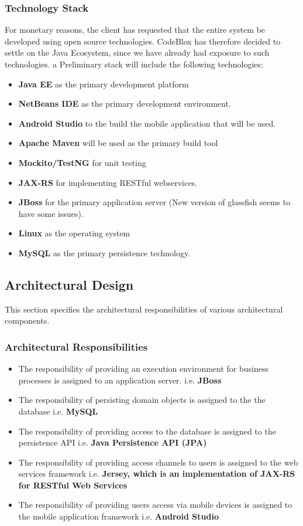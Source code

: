 \documentclass[a4paper,12pt]{article}
\begin{document}
	\subsubsection{Technology Stack}
	For monetary reasons, the client has requested that the entire system be developed using open source technologies. CodeBlox has therefore decided to settle on the Java Ecosystem, since we have already had exposure to such technologies. a Preliminary stack will include the following technologies:
	
	\begin{itemize}
		\item \textbf{Java EE} as the primary development platform
		\item \textbf{NetBeans IDE} as the primary development environment.
		\item \textbf{Android Studio} to the build the mobile application that will be used.
		\item \textbf{Apache Maven} will be used as the primary build tool
		\item \textbf{Mockito/TestNG} for unit testing
		\item \textbf{JAX-RS} for implementing RESTful webservices.
		\item \textbf{JBoss} for the primary application server (New version of glassfish seems to have some issues).
		\item \textbf{Linux} as the operating system
		\item \textbf{MySQL} as the primary persistence technology.
	\end{itemize}
	
	\subsection{Architectural Design}
	This section specifies the architectural responsibilities of various architectural components.
	\subsubsection{Architectural Responsibilities}
	\begin{itemize}
		\item The responsibility of providing an execution environment for business processes is assigned to an application server. i.e. \textbf{JBoss}
		\item The responsibility of persisting domain objects is assigned to the the database i.e. \textbf{MySQL}
		\item The responsibility of providing access to the database is assigned to the persistence API i.e. \textbf{Java Persistence API (JPA)}
		\item The responsibility of providing access channels to users is assigned to the web services framework i.e. \textbf{Jersey, which is an implementation of JAX-RS for RESTful Web Services}
		\item The responsibility of providing users access via mobile devices is assigned to the mobile application framework i.e. \textbf{Android Studio}
	\end{itemize}
	
\end{document}
